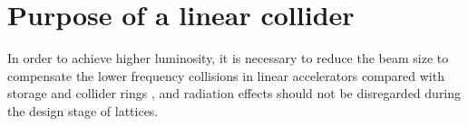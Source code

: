 \chapter{Purpose of a linear collider}


In order to achieve higher luminosity, it is necessary to reduce the beam size to compensate the lower frequency collisions in linear accelerators compared with storage and collider rings \cite{Delahaye1999369}, and radiation effects should not be disregarded during the design stage of lattices. 